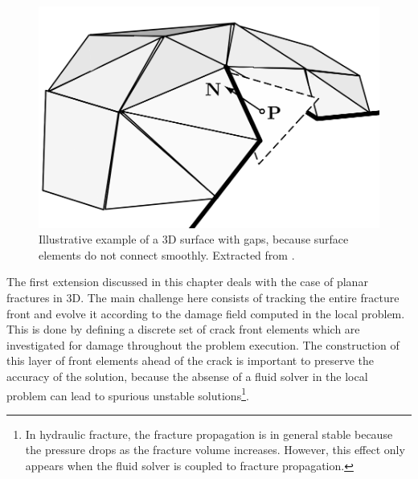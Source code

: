 \begin{figure}[h]
    \centering
    \includegraphics[width=0.6\linewidth]{Chapter4/figures/surface_with_gap.png}
    \caption{Illustrative example of a 3D surface with gaps, because surface elements do not connect smoothly. Extracted from \cite{gasser20063d}.}
    \label{fig:gaps}
\end{figure}

The first extension discussed in this chapter deals with the case of planar fractures in 3D. The main challenge here consists of tracking the entire fracture front and evolve it according to the damage field computed in the local problem. This is done by defining a discrete set of crack front elements which are investigated for damage throughout the problem execution. The construction of this layer of front elements ahead of the crack is important to preserve the accuracy of the solution, because the absense of a fluid solver in the local problem can lead to spurious unstable solutions\footnote{In hydraulic fracture, the fracture propagation is in general stable because the pressure drops as the fracture volume increases. However, this effect only appears when the fluid solver is coupled to fracture propagation.}.  